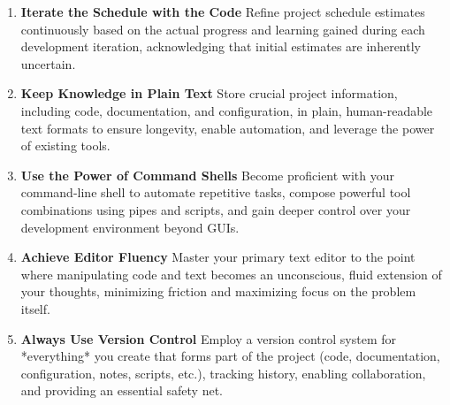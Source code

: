 \documentclass[11pt]{article}
\begin{document}
\begin{tcolorbox}[pragchapterbox={Chapter 3: The Basic Tools}]
\begin{multicols}{2}
\begin{enumerate}[label=\arabic*., start=24, itemsep=1ex, topsep=0pt, partopsep=0pt, labelwidth=!, labelindent=0pt, leftmargin=*]
    \item \textbf{Iterate the Schedule with the Code}
    Refine project schedule estimates continuously based on the actual progress and learning gained during each development iteration, acknowledging that initial estimates are inherently uncertain.

    \item \textbf{Keep Knowledge in Plain Text}
    Store crucial project information, including code, documentation, and configuration, in plain, human-readable text formats to ensure longevity, enable automation, and leverage the power of existing tools.

    \item \textbf{Use the Power of Command Shells}
    Become proficient with your command-line shell to automate repetitive tasks, compose powerful tool combinations using pipes and scripts, and gain deeper control over your development environment beyond GUIs.

    \item \textbf{Achieve Editor Fluency}
    Master your primary text editor to the point where manipulating code and text becomes an unconscious, fluid extension of your thoughts, minimizing friction and maximizing focus on the problem itself.

    \item \textbf{Always Use Version Control}
    Employ a version control system for *everything* you create that forms part of the project (code, documentation, configuration, notes, scripts, etc.), tracking history, enabling collaboration, and providing an essential safety net.
\end{enumerate}
\end{multicols}
\end{tcolorbox}
\end{document}
